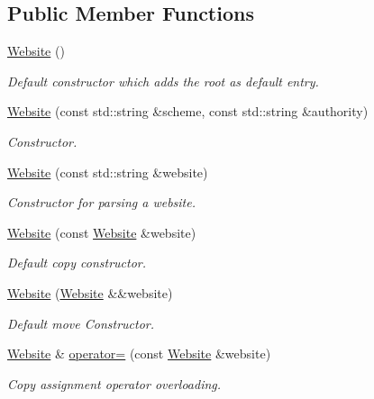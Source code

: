 \subsection*{Public Member Functions}
\begin{DoxyCompactItemize}
\item 
\hyperlink{class_crawler_1_1_website_af117d7f36a02bb69e73abe35c7840fd8}{Website} ()
\begin{DoxyCompactList}\small\item\em Default constructor which adds the root as default entry. \end{DoxyCompactList}\item 
\hyperlink{class_crawler_1_1_website_a1f9fc004b40e3c2ab5a3fabc237fef44}{Website} (const std\+::string \&scheme, const std\+::string \&authority)
\begin{DoxyCompactList}\small\item\em Constructor. \end{DoxyCompactList}\item 
\hyperlink{class_crawler_1_1_website_a0b01cf699479e5c1acd31fc97d10f57e}{Website} (const std\+::string \&website)
\begin{DoxyCompactList}\small\item\em Constructor for parsing a website. \end{DoxyCompactList}\item 
\hyperlink{class_crawler_1_1_website_a207c8f8aea36c7f974c1bc25c533c1de}{Website} (const \hyperlink{class_crawler_1_1_website}{Website} \&website)
\begin{DoxyCompactList}\small\item\em Default copy constructor. \end{DoxyCompactList}\item 
\hyperlink{class_crawler_1_1_website_af1988e1690b7d76d5e04ae25bb7b400f}{Website} (\hyperlink{class_crawler_1_1_website}{Website} \&\&website)
\begin{DoxyCompactList}\small\item\em Default move Constructor. \end{DoxyCompactList}\item 
\hyperlink{class_crawler_1_1_website}{Website} \& \hyperlink{class_crawler_1_1_website_aa2e74f3f60f353ad06b37fe704cbc7fb}{operator=} (const \hyperlink{class_crawler_1_1_website}{Website} \&website)
\begin{DoxyCompactList}\small\item\em Copy assignment operator overloading. \end{DoxyCompactList}\item 

\end{DoxyCompactItemize}

